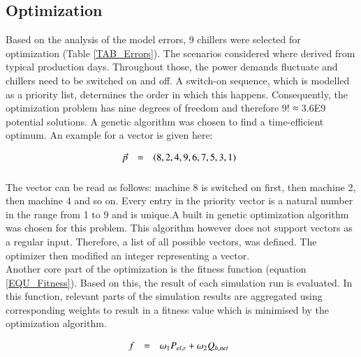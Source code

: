 \documentclass[3p,times,procedia,twocolumn,twoside]{elsarticle}
\begin{document}
\subsection{Optimization}
Based on the analysis of the model errors, 9 chillers were selected for optimization (Table \ref{TAB_Errors}). The scenarios considered where derived from typical production days. Throughout those, the power demands fluctuate and chillers need to be switched on and off. A switch-on sequence, which is modelled as a priority list, determines the order in which this happens. Consequently, the optimization problem has nine degrees of freedom and therefore 9! ≈ 3.6E9 potential solutions. A genetic algorithm was chosen to find a time-efficient optimum.
An example for a vector is given here:

\begin{equation}
\begin{array}{@{}lcl}

\displaystyle 
\vec{p} &=& 
\displaystyle 
\left(8,2,4,9,6,7,5,3,1\right)
\\[6pt]

\end{array}\vspace*{-12pt}
\end{equation}

The vector can be read as follows: machine 8 is switched on first, then machine 2, then machine 4 and so on. Every entry in the priority vector is a natural number in the range from 1 to 9 and is unique.A built in genetic optimization algorithm was chosen for this problem. This algorithm however does not support vectors as a regular input. Therefore, a list of all possible vectors, was defined. The optimizer then modified an integer representing a vector.\\
Another core part of the optimization is the fitness function (equation \ref{EQU_Fitness}). Based on this, the result of each simulation run is evaluated. In this function, relevant parts of the simulation results are aggregated using corresponding weights to result in a fitness value which is minimised by the optimization algorithm.

\begin{equation}
\begin{array}{@{}lcl}

\displaystyle 
f &=& 
\displaystyle 
\omega_{1}P_{el,r} + \omega_{2}Q_{h,net}
\\[6pt]

\end{array}\vspace*{-12pt}
\label{EQU_Fitness}
\end{equation}
\end{document}
